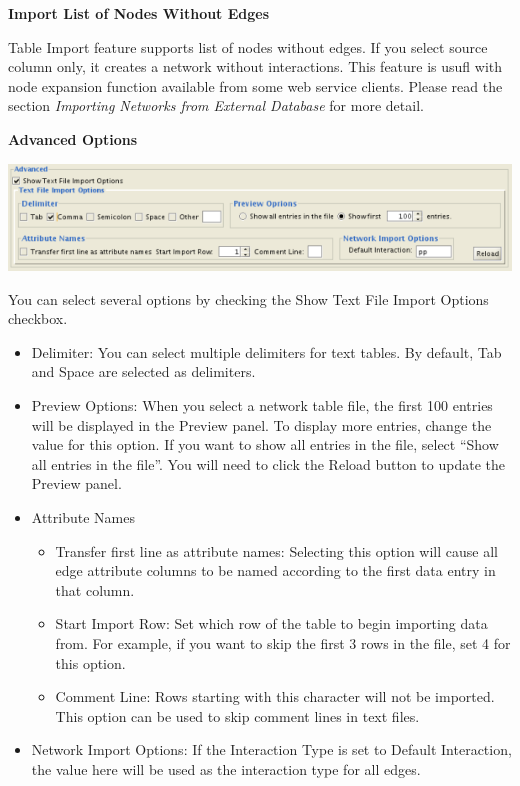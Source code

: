  \textbf{Import List of Nodes Without Edges}

 Table Import feature supports list of nodes without edges. If you select source column only, it creates a network without interactions. This feature is usufl with node expansion function available from some web service clients. Please read the section \emph{Importing Networks from External Database}
 for more detail. 

\textbf{Advanced Options}


 \includegraphics[wdith=\textwidth]{images/network_import_advanced.png} 


 You can select several options by checking the Show Text File Import Options checkbox. 
\begin{itemize}
\item Delimiter: You can select multiple delimiters for text tables. By default, Tab and Space are selected as delimiters. 
\item Preview Options: When you select a network table file, the first 100 entries will be displayed in the Preview panel. To display more entries, change the value for this option. If you want to show all entries in the file, select ``Show all entries in the file''. You will need to click the Reload button to update the Preview panel. 
\item Attribute Names \begin{itemize}
\item Transfer first line as attribute names: Selecting this option will cause all edge attribute columns to be named according to the first data entry in that column. 
\item Start Import Row: Set which row of the table to begin importing data from. For example, if you want to skip the first 3 rows in the file, set 4 for this option. 
\item Comment Line: Rows starting with this character will not be imported. This option can be used to skip comment lines in text files. 
\end{itemize}
\item Network Import Options: If the Interaction Type is set to Default Interaction, the value here will be used as the interaction type for all edges. 
\end{itemize}
 
